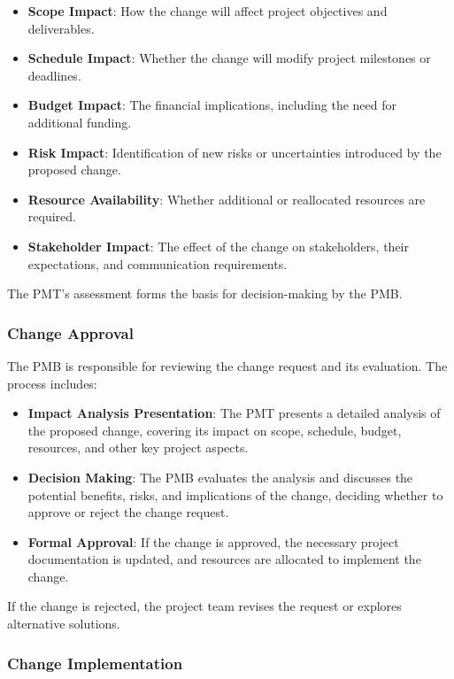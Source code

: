 \documentclass[a4paper,12pt]{article}
\begin{document}
\begin{itemize}[left=1em, itemsep=0pt, topsep=0pt] 
    \item \textbf{Scope Impact}: How the change will affect project objectives and deliverables. 
    \item \textbf{Schedule Impact}: Whether the change will modify project milestones or deadlines. 
    \item \textbf{Budget Impact}: The financial implications, including the need for additional funding.
    \item \textbf{Risk Impact}: Identification of new risks or uncertainties introduced by the proposed change. 
    \item \textbf{Resource Availability}: Whether additional or reallocated resources are required. 
    \item \textbf{Stakeholder Impact}: The effect of the change on stakeholders, their expectations, and communication requirements. 
\end{itemize}

The PMT’s assessment forms the basis for decision-making by the PMB.

\subsubsection*{Change Approval}

The PMB is responsible for reviewing the change request and its evaluation. The process includes:

\begin{itemize}[left=1em, itemsep=0pt, topsep=0pt] 
    \item \textbf{Impact Analysis Presentation}: The PMT presents a detailed analysis of the proposed change, covering its impact on scope, schedule, budget, resources, and other key project aspects. 
    \item \textbf{Decision Making}: The PMB evaluates the analysis and discusses the potential benefits, risks, and implications of the change, deciding whether to approve or reject the change request.
    \item \textbf{Formal Approval}: If the change is approved, the necessary project documentation is updated, and resources are allocated to implement the change. 
\end{itemize}

If the change is rejected, the project team revises the request or explores alternative solutions.

\subsubsection*{Change Implementation}
\end{document}
